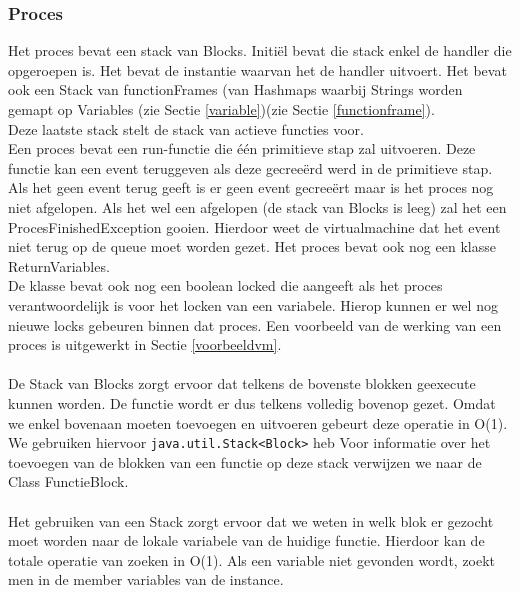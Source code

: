 \documentclass[]{article}
\begin{document}
\subsubsection{Proces}
\label{procesklass}
Het proces bevat een stack van Blocks. Initi\"{e}l bevat die stack enkel de handler die opgeroepen is. Het bevat de instantie waarvan het de handler uitvoert. Het bevat ook een Stack van functionFrames (van Hashmaps waarbij Strings worden gemapt op Variables (zie Sectie \ref{variable})(zie Sectie \ref{functionframe}).\\ Deze laatste stack stelt de stack van actieve functies voor. \\ Een proces bevat een run-functie die \'{e}\'{e}n primitieve stap zal uitvoeren. Deze functie kan een event teruggeven als deze gecree\"{e}rd werd in de primitieve stap. Als het geen event terug geeft is er geen event gecree\"{e}rt maar is het proces nog niet afgelopen. Als het wel een afgelopen (de stack van Blocks is leeg) zal het een ProcesFinishedException gooien. Hierdoor weet de virtualmachine dat het event niet terug op de queue moet worden gezet. Het proces bevat ook nog een klasse ReturnVariables.\\ De klasse bevat ook nog een boolean locked die aangeeft als het proces verantwoordelijk is voor het locken van een variabele. Hierop kunnen er wel nog nieuwe locks gebeuren binnen dat proces. Een voorbeeld van de werking van een proces is uitgewerkt in Sectie \ref{voorbeeldvm}.\\\\
\label{keuzeHashVar}
De Stack \cite{stack} van Blocks zorgt ervoor dat telkens de bovenste blokken geexecute kunnen worden. De functie wordt er dus telkens volledig bovenop gezet. Omdat we enkel bovenaan moeten toevoegen en uitvoeren gebeurt deze operatie in O(1). We gebruiken hiervoor \texttt{java.util.Stack<Block>} heb Voor informatie over het toevoegen van de blokken van een functie op deze stack verwijzen we naar de Class FunctieBlock.\\\\
Het gebruiken van een Stack \cite{stack} zorgt ervoor dat we weten in welk blok er gezocht moet worden naar de lokale variabele van de huidige functie. Hierdoor kan de totale operatie van zoeken in O(1). Als een variable niet gevonden wordt, zoekt men in de member variables van de instance.
\end{document}
